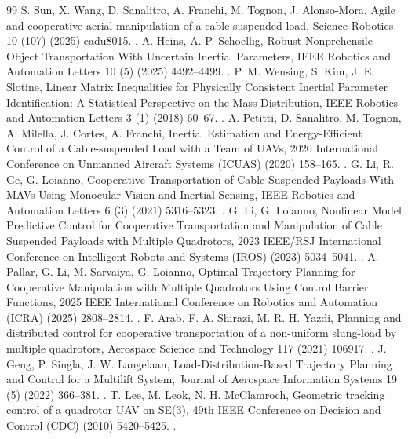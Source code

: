 \begin{thebibliography}{99}
S. Sun, X. Wang, D. Sanalitro, A. Franchi, M. Tognon, J. Alonso-Mora, Agile and cooperative aerial manipulation of a cable-suspended load, Science Robotics 10 (107) (2025) eadu8015. .
A. Heins, A. P. Schoellig, Robust Nonprehensile Object Transportation With Uncertain Inertial Parameters, IEEE Robotics and Automation Letters 10 (5) (2025) 4492--4499. .
P. M. Wensing, S. Kim, J. E. Slotine, Linear Matrix Inequalities for Physically Consistent Inertial Parameter Identification: A Statistical Perspective on the Mass Distribution, IEEE Robotics and Automation Letters 3 (1) (2018) 60--67. .
A. Petitti, D. Sanalitro, M. Tognon, A. Milella, J. Cortes, A. Franchi, Inertial Estimation and Energy-Efficient Control of a Cable-suspended Load with a Team of UAVs, 2020 International Conference on Unmanned Aircraft Systems (ICUAS) (2020) 158--165. .
G. Li, R. Ge, G. Loianno, Cooperative Transportation of Cable Suspended Payloads With MAVs Using Monocular Vision and Inertial Sensing, IEEE Robotics and Automation Letters 6 (3) (2021) 5316--5323. .
G. Li, G. Loianno, Nonlinear Model Predictive Control for Cooperative Transportation and Manipulation of Cable Suspended Payloads with Multiple Quadrotors, 2023 IEEE/RSJ International Conference on Intelligent Robots and Systems (IROS) (2023) 5034--5041. .
A. Pallar, G. Li, M. Sarvaiya, G. Loianno, Optimal Trajectory Planning for Cooperative Manipulation with Multiple Quadrotors Using Control Barrier Functions, 2025 IEEE International Conference on Robotics and Automation (ICRA) (2025) 2808--2814. .
F. Arab, F. A. Shirazi, M. R. H. Yazdi, Planning and distributed control for cooperative transportation of a non-uniform slung-load by multiple quadrotors, Aerospace Science and Technology 117 (2021) 106917. .
J. Geng, P. Singla, J. W. Langelaan, Load-Distribution-Based Trajectory Planning and Control for a Multilift System, Journal of Aerospace Information Systems 19 (5) (2022) 366--381. .
T. Lee, M. Leok, N. H. McClamroch, Geometric tracking control of a quadrotor UAV on SE(3), 49th IEEE Conference on Decision and Control (CDC) (2010) 5420--5425. .

\end{thebibliography}
